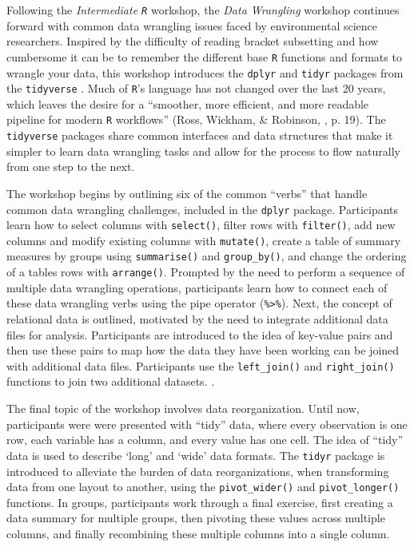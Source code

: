 \documentclass[12pt]{article}
\begin{document}
\quad Following the \emph{Intermediate \texttt{R}} workshop, the \emph{Data 
Wrangling} workshop continues forward with common data wrangling issues faced by
environmental science researchers. Inspired by the difficulty of reading bracket
subsetting and how cumbersome it can be to remember the different base 
\texttt{R} functions and formats to wrangle your data, this workshop introduces 
the \texttt{dplyr} \citep{dpylr} and \texttt{tidyr} \citep{tidyr} packages from
the \texttt{tidyverse} \citep{tidyverse}. Much of \texttt{R}'s language has not
changed over the last 20 years, which leaves the desire for a ``smoother, more
efficient, and more readable pipeline for modern \texttt{R} workflows'' (Ross, 
Wickham, \& Robinson, \citeyear{tidytools}, p. 19). The \texttt{tidyverse}
packages share common interfaces and data structures that make it simpler to
learn data wrangling tasks and allow for the process to flow naturally from one
step to the next. 



\quad The workshop begins by outlining six of the common ``verbs'' that handle
common data wrangling challenges, included in the  \texttt{dplyr} package. 
Participants learn how to select columns with \texttt{select()}, filter rows 
with \texttt{filter()}, add new columns and modify existing columns with 
\texttt{mutate()}, create a table of summary measures by groups using 
\texttt{summarise()} and \texttt{group\_by()}, and change the ordering of a 
tables rows with \texttt{arrange()}. Prompted by the need to perform a sequence
of multiple data wrangling operations, participants learn how to connect each of
these data wrangling verbs using the pipe operator (\texttt{\%>\%}). Next, the
concept of relational data is outlined, motivated by the need to
integrate additional data files for analysis. Participants are introduced to the
idea of key-value pairs and then use these pairs to map how the data they have
been working can be joined with additional data files. Participants use the 
\texttt{left\_join()} and  \texttt{right\_join()} functions to join two 
additional datasets. . 

\quad The final topic of the workshop involves data reorganization. Until now, 
participants were were presented with ``tidy'' data, where every observation is
one row, each variable has a column, and every value has one cell. The idea of 
``tidy'' data is used to describe `long' and `wide' data formats. The 
\texttt{tidyr} package is introduced to alleviate the burden of data 
reorganizations, when transforming data from one layout to another, using the 
\texttt{pivot\_wider()} and \texttt{pivot\_longer()} functions. In groups, 
participants work through a final exercise, first creating a data summary for
multiple groups, then pivoting these values across multiple columns, and finally
recombining these multiple columns into a single column. 
\end{document}
